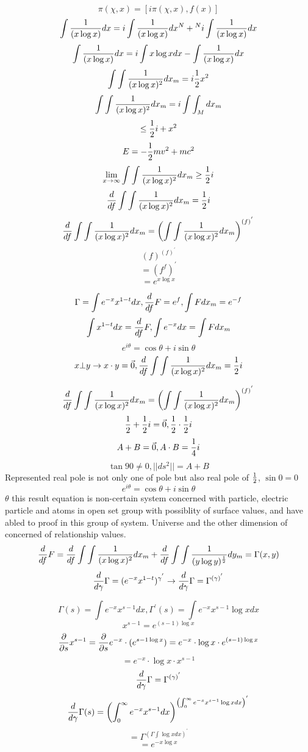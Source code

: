 \documentclass{jsarticle}
\begin{document}
  $$ \pi(\chi,x) = [i\pi(\chi,x),f(x)] $$
  $$ \int{1 \over (x \log x)}dx = i \int{1 \over (x \log x)}dx^{N}  
  + {}^{N} i \int{1 \over (x \log x)}dx $$
  $$  \int{1 \over (x \log x)}dx = i \int{x \log x}dx 
  - \int{1 \over (x \log x)}dx $$
  $$ \int \int{1 \over (x \log x)^2}dx_m = i {1 \over 2}x^2 $$
  $$ \int \int{1 \over (x \log x)^2}dx_m = i \int \int_M dx_m $$
  $$ \le {1 \over 2}i + x^2 $$
  $$ E = - {1 \over 2}mv^2 + mc^2 $$
  $$ \lim_{x \to \infty} \int \int{1 \over (x \log x)^2}dx_m \ge {1 \over 2}i $$
  $$ {d \over df}\int \int{1 \over (x \log x)^2}dx_m = {1 \over 2}i $$
  $$ {d \over df}\int \int{1 \over (x \log x)^2}dx_m = 
  \left(\int \int {1 \over (x \log x)^2}dx_m \right)^{(f)^{'}}$$
  $$ (f)^{(f)^{'}} $$
  $$ = (f^f)^{'} $$
  $$ = e^{x \log x} $$

  $$ \Gamma = \int {e^{-x}x^{1-t}}dx, 
  {d \over df}F = e^f, \int F dx_m = e^{-f} $$
  $$ \int x^{1-t}dx = {d \over df}F, \int e^{-x}dx = \int F dx_m $$
  $$ e^{i \theta} = \cos \theta + i \sin \theta $$
  $$ x \bot y \to x \cdot y = \vec{0}, 
  {d \over df}\int \int{1 \over (x \log x)^2}dx_m = {1 \over 2}i $$

  $$ {d \over df}\int \int{1 \over (x \log x)^2}dx_m = 
  \left(\int \int {1 \over (x \log x)^2}dx_m \right)^{(f)^{'}}$$
  $$ {1 \over 2} + {1 \over 2}i = \vec{0}, {1 \over 2}\cdot{1 \over 2}i $$
  $$ A + B  =  \vec{0}, A \cdot B = {1 \over 4}i $$
  $$  \tan 90 \neq 0, ||ds^2|| = A + B $$
  Represented real pole is not only one of pole but also real pole of 
  $ {1 \over 2} $, 
  $\sin 0 = 0$ $$ e^{i \theta} = \cos \theta + i \sin \theta $$
  $\theta $
  this result equation is non-certain system concerned with particle, electric 
  particle and atoms in open set group with possiblity of surface values,
  and have abled to proof in this group of system. Universe and the other
  dimension of concerned of relationship values.
  $$ {d \over df}F = {d \over df} \int \int{1 \over (x \log x)^2}dx_m 
  + {d \over df} \int \int {1 \over (y \log y)^{1 \over 2}}dy_m
  = \Gamma(x,y) $$
  $$ {d \over d \gamma}\Gamma = (e^{-x}x^{1-t})^{\gamma^{'}} \to
  {d \over d \gamma}\Gamma = \Gamma^{(\gamma)^{'}}$$



    $$ \Gamma(s) = \int e^{-x} x^{s - 1}dx, \Gamma^{'}(s)
    = \int e^{-x} x^{s - 1}\log x dx $$
    $$ x^{s - 1} = e^{(s - 1)\log x} $$
    $$ {\partial \over \partial s}x^{s - 1} =
       {\partial \over \partial s}e^{-x}\cdot (e^{{s - 1}\log x}) 
       = e^{-x}\cdot \log x \cdot e^{(s - 1) \log x} $$
    $$ = e^{-x}\cdot \log x \cdot x^{s - 1} $$
    $$ {d \over d \gamma}\Gamma = \Gamma^{(\gamma)^{'}} $$
    $$ {d \over d \gamma}\Gamma(s) = \left( \int^{\infty}_{0}e^{-x}
    x^{s - 1}dx \right)^{\left(\int^{\infty}_{0}e^{-x}x^{s - 1}\log x dx
    \right)^{'}} $$
    $$ = \Gamma^{(\Gamma \int \log x dx)^{'}} $$
    $$ = e^{-x \log x} $$
\end{document}
